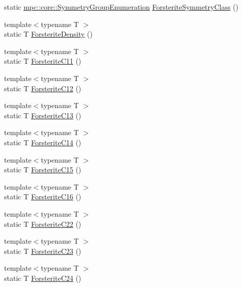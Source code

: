 \begin{DoxyCompactItemize}
\item 
static \mbox{\hyperlink{namespacempc_1_1core_a9d979684062547055a0ef5c13077bad8}{mpc\+::core\+::\+Symmetry\+Group\+Enumeration}} \mbox{\hyperlink{namespacempc_1_1data_ae594bd328f4890f39d41b33f65eca575}{Forsterite\+Symmetry\+Class}} ()
\item 
{\footnotesize template$<$typename T $>$ }\\static T \mbox{\hyperlink{namespacempc_1_1data_ac84316afdcfa54817a1d37bd19919895}{Forsterite\+Density}} ()
\item 
{\footnotesize template$<$typename T $>$ }\\static T \mbox{\hyperlink{namespacempc_1_1data_a2666a94f7066d312a7778cedb4b9252e}{Forsterite\+C11}} ()
\item 
{\footnotesize template$<$typename T $>$ }\\static T \mbox{\hyperlink{namespacempc_1_1data_af561e4e0c1e98b81097887ab8bfa1033}{Forsterite\+C12}} ()
\item 
{\footnotesize template$<$typename T $>$ }\\static T \mbox{\hyperlink{namespacempc_1_1data_a66f3de0039cd94bfa181df2d9a8cdfac}{Forsterite\+C13}} ()
\item 
{\footnotesize template$<$typename T $>$ }\\static T \mbox{\hyperlink{namespacempc_1_1data_a1bf5e2c7cdd8517953b8c56bca311803}{Forsterite\+C14}} ()
\item 
{\footnotesize template$<$typename T $>$ }\\static T \mbox{\hyperlink{namespacempc_1_1data_a917eeffa08079985c639a9bb10e76d2c}{Forsterite\+C15}} ()
\item 
{\footnotesize template$<$typename T $>$ }\\static T \mbox{\hyperlink{namespacempc_1_1data_ab06dd444b8377d5562408cb80a82fd88}{Forsterite\+C16}} ()
\item 
{\footnotesize template$<$typename T $>$ }\\static T \mbox{\hyperlink{namespacempc_1_1data_a83a914039d4a81b37e854d76a95e9a1d}{Forsterite\+C22}} ()
\item 
{\footnotesize template$<$typename T $>$ }\\static T \mbox{\hyperlink{namespacempc_1_1data_ab0f172914c41ce2226932800c7473186}{Forsterite\+C23}} ()
\item 
{\footnotesize template$<$typename T $>$ }\\static T \mbox{\hyperlink{namespacempc_1_1data_a6dd48ff1b45434b2448dd987a7c6dc14}{Forsterite\+C24}} ()

\end{DoxyCompactItemize}
